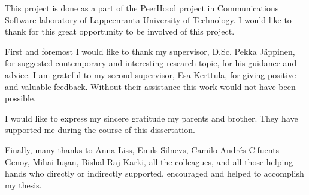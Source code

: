%
This project is done as a part of the PeerHood project in Communications Software laboratory of
Lappeenranta University of Technology.
%
I would like to thank for this great opportunity to be involved of this project.

%
First and foremost I would like to thank my supervisor, D.Sc. Pekka J\"appinen, for suggested
contemporary and interesting research topic, for his guidance and advice. 
%
I am grateful to my second supervisor, Esa Kerttula, for giving positive and valuable feedback. 
%
Without their assistance this work would not have been possible.

%
I would like to express my sincere gratitude my parents and brother.
%
They have supported me during the course of this dissertation.

%
Finally, many thanks to Anna Liss, Em\={i}ls \u{S}i\cb l\cb nevs, Camilo Andr\'{e}s
Cifuents Genoy, Mihai Iu\c{s}an, Bishal Raj Karki, all the colleagues, and all those helping hands
who directly or indirectly supported, encouraged and helped to accomplish my thesis.